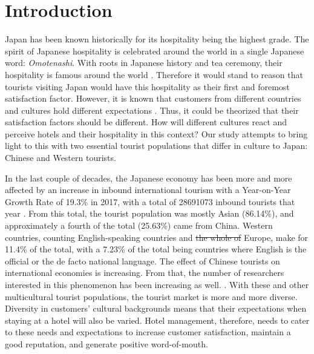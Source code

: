 \documentclass[smallextended,natbib]{svjour3}       %
\providecommand{\DIFdel}[1]{{\protect\color{red}\sout{#1}}}                      %
\providecommand{\DIFaddbegin}{} %
\providecommand{\DIFaddend}{} %
\providecommand{\DIFdelbegin}{} %
\providecommand{\DIFdelend}{} %
\begin{document}
\begin{abstract}

\end{abstract}

\linenumbers

\section{Introduction}\label{intro}

  Japan has been known historically for its hospitality being the highest grade. The spirit of Japanese hospitality is celebrated around the world in a single Japanese word: \textit{Omotenashi}. With roots in Japanese history and tea ceremony, their hospitality is famous around the world \DIFdelbegin %
\DIFdelend \DIFaddbegin \cite[][]{al2015characteristics}\DIFaddend . Therefore it would stand to reason that tourists visiting Japan would have this hospitality as their first and foremost satisfaction factor. However, it is known that customers from different countries and cultures hold different expectations \DIFdelbegin %
\DIFdelend \DIFaddbegin \cite[][]{engel1990}\DIFaddend . Thus, it could be theorized that their satisfaction factors should be different. How will different cultures react and perceive hotels and their hospitality in this context? Our study attempts to bring light to this with two essential tourist populations that differ in culture to Japan: Chinese and Western tourists. 

  In the last couple of decades, the Japanese economy has been more and more affected by an increase in inbound international tourism \cite[][]{jones2009} with a Year-on-Year Growth Rate of 19.3\% in 2017, with a total of \num[group-separator={,}]{28691073} inbound tourists that year \cite[][]{jnto2003-2019}. From this total, the tourist population was mostly Asian (86.14\%), and approximately a fourth of the total (25.63\%) came from China. Western countries, counting English-speaking countries and \DIFdelbegin \DIFdel{the whole of }\DIFdelend Europe, make for 11.4\% of the total, with a 7.23\% of the total being countries where English is the official or the de facto national language. The effect of Chinese tourists on international economies is increasing. From that, the number of researchers interested in this phenomenon has been increasing as well. \cite[][]{sun2017}. With these and other multicultural tourist populations, the tourist market is more and more diverse. Diversity in customers' cultural backgrounds means that their expectations when staying at a hotel will also be varied. Hotel management, therefore, needs to cater to these needs and expectations to increase customer satisfaction, maintain a good reputation, and generate positive word-of-mouth.
\end{document}
